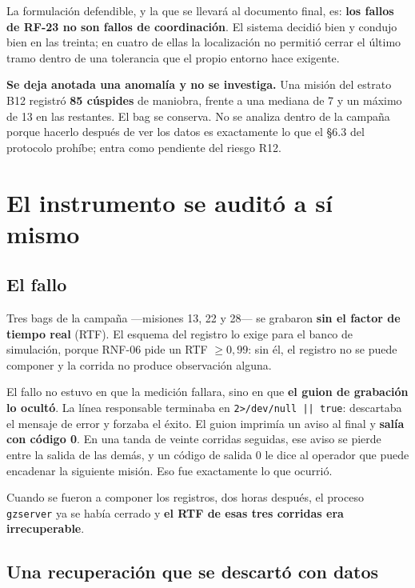 \documentclass[12pt,letterpaper]{article}
\begin{document}
La formulación defendible, y la que se llevará al documento final, es: \textbf{los fallos de RF-23 no son fallos de coordinación}. El sistema decidió bien y condujo bien en las treinta; en cuatro de ellas la localización no permitió cerrar el último tramo dentro de una tolerancia que el propio entorno hace exigente.

\textbf{Se deja anotada una anomalía y no se investiga.} Una misión del estrato B12 registró \textbf{85 cúspides} de maniobra, frente a una mediana de 7 y un máximo de 13 en las restantes. El bag se conserva. No se analiza dentro de la campaña porque hacerlo después de ver los datos es exactamente lo que el \S 6.3 del protocolo prohíbe; entra como pendiente del riesgo R12.

\section{El instrumento se auditó a sí mismo}
\label{sec:rtf}

\subsection{El fallo}

Tres bags de la campaña ---misiones 13, 22 y 28--- se grabaron \textbf{sin el factor de tiempo real} (RTF). El esquema del registro lo exige para el banco de simulación, porque RNF-06 pide un RTF $\geq 0{,}99$: sin él, el registro no se puede componer y la corrida no produce observación alguna.

El fallo no estuvo en que la medición fallara, sino en que \textbf{el guion de grabación lo ocultó}. La línea responsable terminaba en \texttt{2>/dev/null || true}: descartaba el mensaje de error y forzaba el éxito. El guion imprimía un aviso al final y \textbf{salía con código 0}. En una tanda de veinte corridas seguidas, ese aviso se pierde entre la salida de las demás, y un código de salida 0 le dice al operador que puede encadenar la siguiente misión. Eso fue exactamente lo que ocurrió.

Cuando se fueron a componer los registros, dos horas después, el proceso \texttt{gzserver} ya se había cerrado y \textbf{el RTF de esas tres corridas era irrecuperable}.

\subsection{Una recuperación que se descartó con datos}
\end{document}
